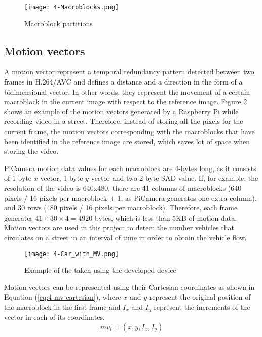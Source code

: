 \begin{figure}[!h]
	\begin{center}
		\texttt{[image: 4-Macroblocks.png]}
		\caption{Macroblock partitions}
		\label{fig:4-Macroblocks}
	\end{center}
\end{figure}


\subsection{Motion vectors}
A motion vector represent a temporal redundancy pattern detected between two frames in H.264/AVC and defines a distance and a direction in the form of a bidimensional vector. In other words, they represent the movement of a certain macroblock in the current image with respect to the reference image. Figure \ref{fig:4-Car_with_MV} shows an example of the motion vectors generated by a Raspberry Pi while recording video in a street. Therefore, instead of storing all the pixels for the current frame, the motion vectors corresponding with the macroblocks that have been identified in the reference image are stored, which saves lot of space when storing the video.

PiCamera motion data values for each macroblock are 4-bytes long, as it consists of 1-byte $x$ vector, 1-byte $y$ vector and two 2-byte \ac{SAD} value. If, for example, the resolution of the video is 640x480, there are 41 columns of macroblocks (640 pixels / 16 pixels per macroblock + 1, as PiCamera generates one extra column), and 30 rows (480 pixels / 16 pixels per macroblock). Therefore, each frame generates $41\times30\times4 = 4920$ bytes, which is less than 5KB of motion data. Motion vectors are used in this project to detect the number vehicles that circulates on a street in an interval of time in order to obtain the vehicle flow.

\begin{figure}[!h]
	\begin{center}
		\texttt{[image: 4-Car\_with\_MV.png]}
		\caption{Example of  the  taken using the developed device}
		\label{fig:4-Car_with_MV}
	\end{center}
\end{figure}

Motion vectors can be represented using their Cartesian coordinates as shown in Equation (\ref{eq:4-mv-cartesian}), where $x$ and $y$ represent the original position of the macroblock in the first frame and $I_{x}$ and $I_{y}$ represent the increments of the vector in each of its coordinates.
\begin{equation} \label{eq:4-mv-cartesian}
mv_{i} = (x, y, I_{x}, I_{y})
\end{equation}

